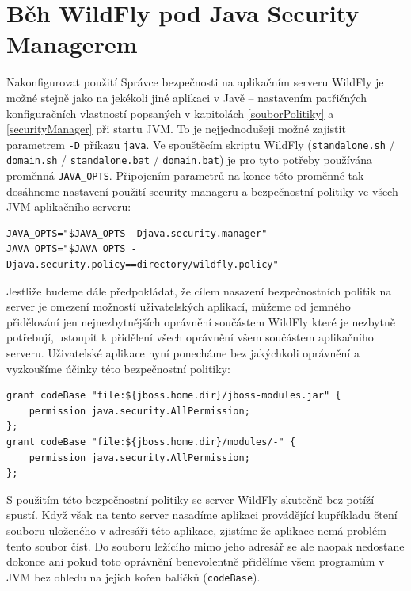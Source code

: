 \section{Běh WildFly pod Java Security Managerem}

Nakonfigurovat použití Správce bezpečnosti na aplikačním serveru WildFly je možné stejně jako na jekékoli jiné aplikaci v Javě -- nastavením patřičných konfiguračních vlastností popsaných v kapitolách \ref{souborPolitiky} a \ref{securityManager} při startu JVM. To je nejjednodušeji možné zajistit parametrem {\tt -D} příkazu {\tt java}. Ve spouštěcím skriptu WildFly ({\tt standalone.sh} / {\tt domain.sh} / {\tt standalone.bat} / {\tt domain.bat}) je pro tyto potřeby používána proměnná {\tt JAVA\_OPTS}. Připojením parametrů na konec této proměnné tak dosáhneme nastavení použití security manageru a bezpečnostní politiky ve všech JVM aplikačního serveru: \cite{jbossSecurityManager}

\begin{verbatim}
JAVA_OPTS="$JAVA_OPTS -Djava.security.manager"
JAVA_OPTS="$JAVA_OPTS -Djava.security.policy==directory/wildfly.policy"
\end{verbatim}

Jestliže budeme dále předpokládat, že cílem nasazení bezpečnostních politik na server je omezení možností uživatelských aplikací, můžeme od jemného přidělování jen nejnezbytnějších oprávnění součástem WildFly které je nezbytně potřebují, ustoupit k přidělení všech oprávnění všem součástem aplikačního serveru. Uživatelské aplikace nyní ponecháme bez jakýchkoli oprávnění a vyzkoušíme účinky této bezpečnostní politiky:

\begin{verbatim}
grant codeBase "file:${jboss.home.dir}/jboss-modules.jar" {
    permission java.security.AllPermission;
};
grant codeBase "file:${jboss.home.dir}/modules/-" {
    permission java.security.AllPermission;
};
\end{verbatim}

S použitím této bezpečnostní politiky se server WildFly skutečně bez potíží spustí. Když však na tento server nasadíme aplikaci provádějící kupříkladu čtení souboru uloženého v adresáři této aplikace, zjistíme že aplikace nemá problém tento soubor číst. Do souboru ležícího mimo jeho adresář se ale naopak nedostane dokonce ani pokud toto oprávnění benevolentně přidělíme všem programům v JVM bez ohledu na jejich kořen balíčků ({\tt codeBase}).

